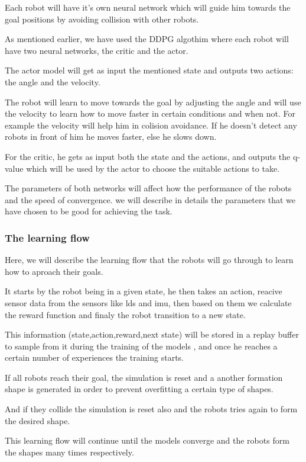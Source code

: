 \documentclass[12pt]{extarticle}
\begin{document}
Each robot will have it's own neural network which will guide him towards the goal positions by avoiding collision with other robots.

As  mentioned earlier, we have used the DDPG algothim where each robot will have two neural networks, the critic and the actor.

The actor model will get as input the mentioned state and outputs two actions: the angle and the velocity.

The robot will learn to  move towards the goal by adjusting the angle and will use the velocity to learn how to move faster in certain conditions and when not. For example the velocity will
help him in colision avoidance. If he doesn't detect any robots in front of him  he moves faster, else he slows down.


For the critic, he gets as input both the state and the actions, and outputs the q-value which will be used by the actor to choose the suitable actions to take.

The parameters of both networks will affect how the performance of the robots and the speed of convergence. we will describe in details the parameters that we have chosen to be good for achieving the task.

\subsubsection{The learning flow}
Here, we will describe the learning flow that the robots will go through to learn how to aproach their goals.

It starts by the robot being in a given state, he then takes an action,  reacive sensor data from the sensors like lds and imu, then based on them we calculate the reward function and finaly the robot transition to a new state.

This information (state,action,reward,next state) will be stored in a replay buffer to sample from it during the training of the models , and once he reaches a certain number of experiences the training starts.



If all robots reach their goal, the simulation is reset and a another formation shape is generated in order to prevent overfitting a certain type of shapes.

And if they collide the simulation is reset also and the robots tries again to form the desired shape.

This learning flow will continue until the models converge and the robots form the shapes many times respectively.
\end{document}
